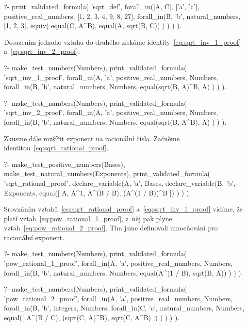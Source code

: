 \begin{prolog}
?-	print_validated_formula(
		'sqrt_def',
		forall_in([A, C], ['a', 'c'], positive_real_numbers, [1, 2, 3, 4, 9, 8, 27],
			forall_in(B, 'b', natural_numbers, [1, 2, 3],
				equiv(
					equal(C, A^B),
					equal(A, sqrt(B, C))
				)
			)
		)
	).				
\end{prolog}

Dosazením jednoho vztahu do druhého získáme identity~\eqref{eq:sqrt_inv_1_proof} a~\eqref{eq:sqrt_inv_2_proof}.

\begin{prolog}
?-	make_test_numbers(Numbers),
	print_validated_formula(
		'sqrt_inv_1_proof',
		forall_in(A, 'a', positive_real_numbers, Numbers,
			forall_in(B, 'b', natural_numbers, Numbers,
				equal(sqrt(B, A)^B, A)
			)
		)
	).				
\end{prolog}
\begin{prolog}
?-	make_test_numbers(Numbers),
	print_validated_formula(
		'sqrt_inv_2_proof',
		forall_in(A, 'a', positive_real_numbers, Numbers,
			forall_in(B, 'b', natural_numbers, Numbers,
				equal(sqrt(B, A^B), A)
			)
		)
	).				
\end{prolog}

Zkusme dále rozšířit exponent na racionální čísla. Začněme identitou~\eqref{eq:sqrt_rational_proof}.

\begin{prolog}
?-	make_test_positive_numbers(Bases),
	make_test_natural_numbers(Exponents),
	print_validated_formula(
		'sqrt_rational_proof',
		declare_variable(A, 'a', Bases,
			declare_variable(B, 'b', Exponents,
				equal([
					A,
					A^1,
					A^(B / B),
					(A^(1 / B))^B
				])
			)
		)
	).				
\end{prolog}

Srovnáním vztahů~\eqref{eq:sqrt_rational_proof} a~\eqref{eq:sqrt_inv_1_proof} vidíme, že platí vztah~\eqref{eq:pow_rational_1_proof}, z~něj pak plyne vztah~\eqref{eq:pow_rational_2_proof}. Tím jsme definovali umocňování pro racionální exponent.

\begin{prolog}
?-	make_test_numbers(Numbers),
	print_validated_formula(
		'pow_rational_1_proof',
		forall_in(A, 'a', positive_real_numbers, Numbers,
			forall_in(B, 'b', natural_numbers, Numbers,
				equal(A^(1 / B), sqrt(B, A))
			)
		)
	).				
\end{prolog}
\begin{prolog}
?-	make_test_numbers(Numbers),
	print_validated_formula(
		'pow_rational_2_proof',
		forall_in(A, 'a', positive_real_numbers, Numbers,
			forall_in(B, 'b', integers, Numbers,
				forall_in(C, 'c', natural_numbers, Numbers,
					equal([
						A^(B / C),
						(sqrt(C, A)^B),
						sqrt(C, A^B)
					])
				)
			)
		)
	).				
\end{prolog}


